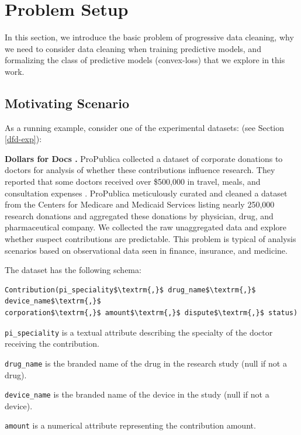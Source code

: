 \section{Problem Setup}\label{background}
In this section, we introduce the basic problem of progressive data cleaning, why we need to consider data cleaning when training predictive models, and formalizing the class of predictive models (convex-loss) that we explore in this work.

\subsection{Motivating Scenario}
As a running example, consider one of the experimental datasets: (see Section \ref{dfd-exp}):

\vspace{0.25em}

\noindent\textbf{Dollars for Docs \cite{dollarsfordocs}. }
ProPublica collected a dataset of corporate donations to doctors for analysis of whether these contributions influence research. 
They reported that some doctors received over \$500,000 in travel, meals, and consultation expenses \cite{dollarsfordocsa}.
ProPublica meticulously curated and cleaned a dataset from the Centers for Medicare and Medicaid Services listing nearly 250,000 research donations and aggregated these donations by physician, drug, and pharmaceutical company.
We collected the raw unaggregated data and explore whether suspect contributions are predictable.
This problem is typical of analysis scenarios based on observational data seen in finance, insurance, and medicine.

The dataset has the following schema:
\begin{lstlisting}[mathescape,basicstyle={\scriptsize}]
Contribution(pi_speciality$\textrm{,}$ drug_name$\textrm{,}$ device_name$\textrm{,}$
corporation$\textrm{,}$ amount$\textrm{,}$ dispute$\textrm{,}$ status)
\end{lstlisting}

\noindent\texttt{pi\_speciality} is a textual attribute describing the specialty of the doctor receiving the contribution.

\noindent\texttt{drug\_name} is the branded name of the drug in the research study (null if not a drug).

\noindent\texttt{device\_name} is the branded name of the device in the study (null if not a device).

\noindent\texttt{amount} is a numerical attribute representing the contribution amount.

